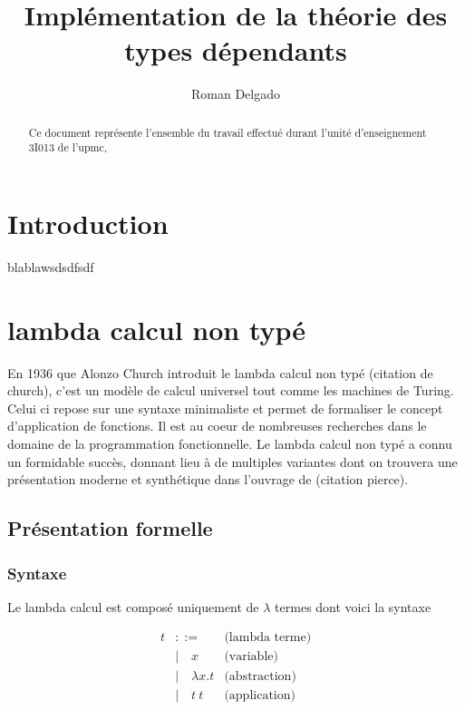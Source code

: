 \documentclass {article}
\title{Implémentation de la théorie des types dépendants}
\author{Roman Delgado}
\date{}
\theoremstyle{definition}
\theoremstyle{remark}
\begin{document}
\maketitle




\begin{abstract} 
  Ce document représente l'ensemble du travail effectué durant l'unité d'enseignement 3I013 de l'upmc,
\end{abstract}

\tableofcontents

\clearpage


\section{Introduction}

blablawsdsdfsdf

\section{lambda calcul non typé}

En 1936 que Alonzo Church introduit le lambda calcul non typé
(citation de church), c'est
un modèle de calcul universel tout comme les machines de Turing. Celui ci repose
sur une syntaxe minimaliste et permet de formaliser le concept d'application 
de fonctions. Il est au coeur de nombreuses recherches dans le domaine de la 
programmation fonctionnelle. Le lambda calcul non typé a connu un formidable 
succès, donnant lieu à de multiples variantes dont on trouvera une présentation
 moderne et synthétique dans l'ouvrage de (citation pierce).

\subsection{Présentation formelle}

\subsubsection{Syntaxe}
Le lambda calcul est composé uniquement de \(\lambda\) termes dont voici la syntaxe

\begin{align*}
  t &::= & \mbox{(lambda terme)} \\
  &|\quad x & \mbox{(variable)} \\
  &|\quad \lambda x. t & \mbox{(abstraction)} \\
  &|\quad t\: t          & \mbox{(application)}
\end{align*}
\end{document}
